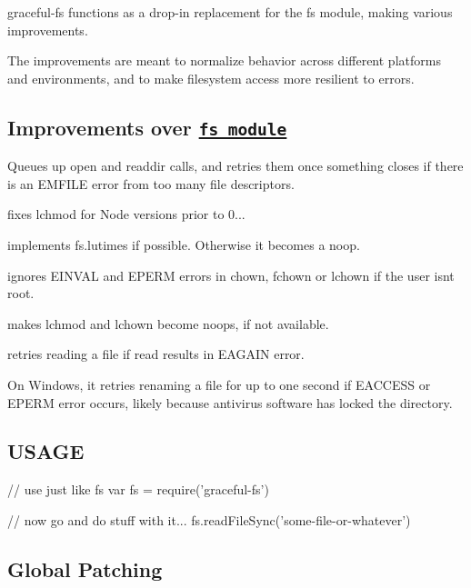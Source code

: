 graceful-\/fs functions as a drop-\/in replacement for the fs module, making various improvements.

The improvements are meant to normalize behavior across different platforms and environments, and to make filesystem access more resilient to errors.

\subsection*{Improvements over \href{https://nodejs.org/api/fs.html}{\tt fs module}}


\begin{DoxyItemize}
\item Queues up {\ttfamily open} and {\ttfamily readdir} calls, and retries them once something closes if there is an E\+M\+F\+I\+LE error from too many file descriptors.
\item fixes {\ttfamily lchmod} for Node versions prior to 0...
\item implements {\ttfamily fs.\+lutimes} if possible. Otherwise it becomes a noop.
\item ignores {\ttfamily E\+I\+N\+V\+AL} and {\ttfamily E\+P\+E\+RM} errors in {\ttfamily chown}, {\ttfamily fchown} or {\ttfamily lchown} if the user isn\textquotesingle{}t root.
\item makes {\ttfamily lchmod} and {\ttfamily lchown} become noops, if not available.
\item retries reading a file if {\ttfamily read} results in E\+A\+G\+A\+IN error.
\end{DoxyItemize}

On Windows, it retries renaming a file for up to one second if {\ttfamily E\+A\+C\+C\+E\+SS} or {\ttfamily E\+P\+E\+RM} error occurs, likely because antivirus software has locked the directory.

\subsection*{U\+S\+A\+GE}


\begin{DoxyCode}
// use just like fs
var fs = require('graceful-fs')

// now go and do stuff with it...
fs.readFileSync('some-file-or-whatever')
\end{DoxyCode}


\subsection*{Global Patching}

